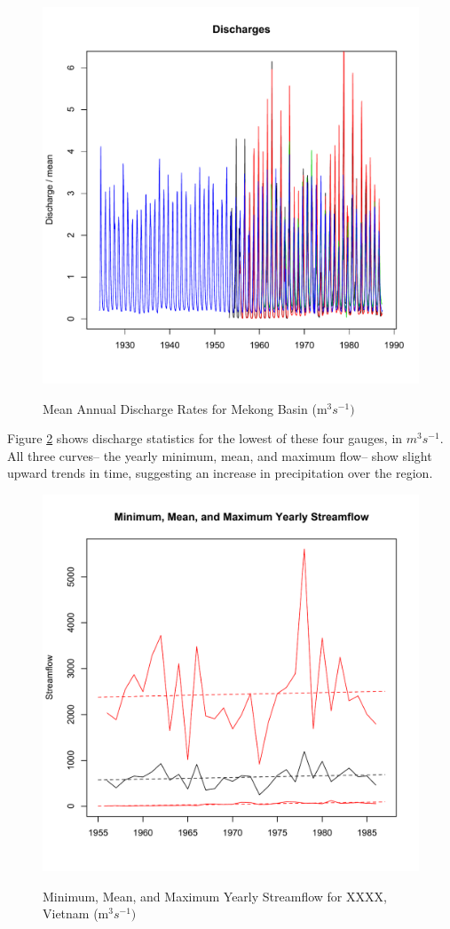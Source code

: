 \documentclass[11pt,english]{article}
\theoremstyle{plain} \newtheorem{claim}{Claim}
\theoremstyle{plain} \newtheorem{prop}{Proposition}
\theoremstyle{plain} \newtheorem{hypo}{Hypothesis}
\begin{document}
\begin{figure}
\includegraphics{Displays/discharge_time.pdf}
\label{discharge}
\caption{Mean Annual Discharge Rates for Mekong Basin (m$^3 s^{-1})$} 
\end{figure}
 
Figure \ref{bottom} shows discharge statistics for the lowest of these four gauges, in $m^3 s^{-1}$. %
All three curves-- the yearly minimum, mean, and maximum flow-- show slight upward trends in time, suggesting an increase in precipitation over the region.
 
\begin{figure}
\includegraphics{Displays/bottom-year.pdf}
\label{bottom}
\caption{Minimum, Mean, and Maximum Yearly Streamflow for XXXX, Vietnam (m$^3 s^{-1})$}
\end{figure}
\end{document}
